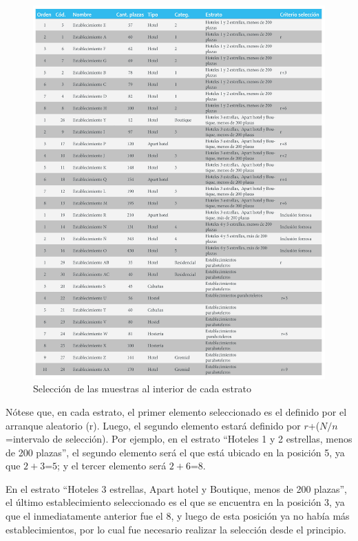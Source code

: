 \documentclass[
]{book}
\begin{document}
\begin{figure}

{\centering \includegraphics[width=1\linewidth]{imagenes/tabla_3} 

}

\caption{Selección de las muestras al interior de cada estrato}\label{fig:muestra-interior}
\end{figure}

Nótese que, en cada estrato, el primer elemento seleccionado es el definido por el arranque aleatorio (r). Luego, el segundo elemento estará definido por \(r\)+(\(N/n\)=intervalo de selección). Por ejemplo, en el estrato ``Hoteles 1 y 2 estrellas, menos de 200 plazas'', el segundo elemento será el que está ubicado en la posición 5, ya que \(2+3\)=\(5\); y el tercer elemento será \(2+6\)=\(8\).

En el estrato ``Hoteles 3 estrellas, Apart hotel y Boutique, menos de 200 plazas'', el último establecimiento seleccionado es el que se encuentra en la posición 3, ya que el inmediatamente anterior fue el 8, y luego de esta posición ya no había más establecimientos, por lo cual fue necesario realizar la selección desde el principio.
\end{document}
